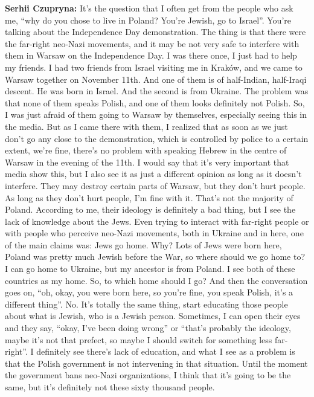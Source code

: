 \textbf{Serhii Czupryna:} It’s the question that I often get from the people who ask me, ``why do you chose to live in Poland? You’re Jewish, go to Israel''. You’re talking about the Independence Day demonstration. The thing is that there were the far-right neo-Nazi movements, and it may be not very safe to interfere with them in Warsaw on the Independence Day. I was there once, I just had to help my friends. I had two friends from Israel visiting me in Kraków, and we came to Warsaw together on  November 11th. And one of them is of half-Indian, half-Iraqi descent. He was born in Israel. And the second is from Ukraine. The problem was that none of them speaks Polish, and one of them looks definitely not Polish. So, I was just afraid of them going to Warsaw by themselves, especially seeing this in the media. But as I came there with them, I realized that as soon as we just don’t go any close to the demonstration, which is controlled by police to a certain extent, we’re fine, there’s no problem with speaking Hebrew in the centre of Warsaw in the evening of the 11th. I would say that it’s very important that media show this, but I also see it as just a different opinion as long as it doesn’t interfere. They may destroy certain parts of Warsaw, but they don’t hurt people. As long as they don’t hurt people, I’m fine with it. That’s not the majority of Poland. According to me, their ideology is definitely a bad thing, but I see the lack of knowledge about the Jews. Even trying to interact with far-right people or with people who perceive neo-Nazi movements, both in Ukraine and in here, one of the main claims was: Jews go home. Why? Lots of Jews were born here, Poland was pretty much Jewish before the War, so where should we go home to? I can go home to Ukraine, but my ancestor is from Poland. I see both of these countries as my home. So, to which home should I go? And then the conversation goes on, ``oh, okay, you were born here, so you’re fine, you speak Polish, it’s a different thing''. No. It’s totally the same thing, start educating those people about what is Jewish, who is a Jewish person. Sometimes, I can open their eyes and they say, ``okay, I’ve been doing wrong'' or ``that’s probably the ideology, maybe it’s not that prefect, so maybe I should switch for something less far-right''. I definitely see there’s lack of education, and what I see as a problem is that the Polish government is not intervening in that situation. Until the moment the government bans neo-Nazi organizations, I think that it’s going to be the same, but it’s definitely not these sixty thousand people.\par
